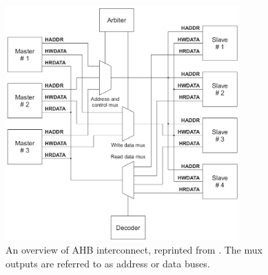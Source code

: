 \begin{figure}[hbt]
    \begin{center}
        \includegraphics[width=0.8\textwidth]{figs/AHB/AHB_connections.png}
    \end{center}
    \caption{An overview of AHB interconnect, reprinted from \cite{amba}. The mux outputs are referred to as address or data buses.}
    \label{fig:interc}
\end{figure}


